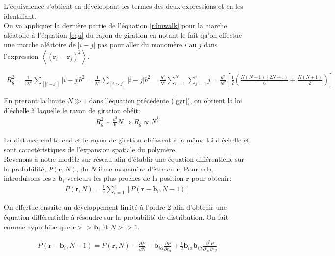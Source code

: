 \documentclass[a4paper,11pt]{article}
\begin{document}
 L'équivalence s'obtient en développant les termes des deux expressions et en les identifiant.\\


On va appliquer la dernière partie de l'équation \ref{rdmwalk} pour la marche aléatoire à l'équation \ref{equ} du rayon de giration en notant le fait qu'on effectue une marche aléatoire de $|i-j|$ pas pour aller du monomère $i$ au $j$ dans l'expression $\left<(\textbf{r}_i - \textbf{r}_j)^2\right>$.

\begin{eqnarray}
R_g^2\text{}=\text{}\frac{1}{2N^2}\sum_{[|i-j|]} |i-j| b^2=\text{}\frac{1}{N^2}\sum_{[i>j]} |i-j| b^2 =\text{}\frac{b^2}{N^2} \sum_{i=1}^N \sum_{j=1}^{i} j = \text{}\frac{b^2}{N^2}[\frac{1}{2}(\frac{N(N+1)(2N+1)}{6}+\frac{N(N+1)}{2})]
\label{gyr}
\end{eqnarray}

En prenant la limite $N \gg 1$ dans l'équation précédente (\ref{gyr}), on obtient la loi d'échelle à laquelle le rayon de giration obéit:
\begin{eqnarray}
R_g^2\text{}\sim\text{}\frac{b^2}{6}N \Rightarrow R_g\propto N^{\frac12}
\end{eqnarray}

La distance end-to-end et le rayon de giration obéissent à la même loi d'échelle et sont caractéristiques de l'expansion spatiale du polymère.\\


Revenons à notre modèle sur réseau afin d'établir une équation différentielle sur la probabilité, $P(\textbf{r},N)$, du $N$-ième monomère d'être en $\textbf{r}$. Pour cela, introduisons les z $\textbf{b}_i$  vecteurs les plus proches de la position $\textbf{r}$ pour obtenir:
\begin{eqnarray}
P(\textbf{r},N)= \frac{1}{z}\sum_{i=1}^{z} \left[P(\textbf{r}-\textbf{b}_i,N-1)\right]
\label{eqdifprob}
\end{eqnarray}

On effectue ensuite un développement limité à l'ordre 2 afin d'obtenir une équation différentielle à résoudre sur la probabilité de distribution. On fait comme hypothèse que $\textbf{r}>>\textbf{b}_i$ et $N >> 1$.

\begin{eqnarray}
P(\textbf{r}-\textbf{b}_i,N-1)=P(\textbf{r},N)- \frac{\partial P}{\partial N}-  \textbf{b}_{i\alpha} \frac{\partial P}{\partial r_{\alpha} } + \frac12 \textbf{b}_{i\alpha}\textbf{b}_{i\beta} \frac{\partial ^2 P}{\partial r_{\alpha}\partial r_{\beta} }
\end{eqnarray}
\end{document}
